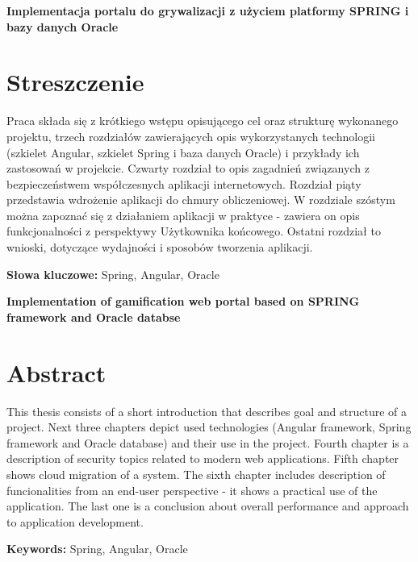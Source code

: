 \newpage
\begin{center}
\large \bf
Implementacja portalu do grywalizacji z użyciem platformy SPRING i bazy danych Oracle
\end{center}

\section*{Streszczenie}
Praca składa się z krótkiego wstępu opisującego cel oraz strukturę wykonanego projektu, trzech rozdziałów
zawierających opis wykorzystanych technologii (szkielet Angular, szkielet Spring i baza danych Oracle) i przykłady ich zastosowań w projekcie. Czwarty rozdział to opis zagadnień związanych z bezpieczeństwem współczesnych aplikacji internetowych. Rozdział piąty przedstawia wdrożenie aplikacji do chmury obliczeniowej. W rozdziale szóstym można zapoznać się z działaniem aplikacji w praktyce - zawiera on opis funkcjonalności z perspektywy Użytkownika końcowego. Ostatni rozdział to wnioski, dotyczące wydajności i sposobów tworzenia aplikacji.

\bigskip
{\noindent\bf Słowa kluczowe:} Spring, Angular, Oracle

\vskip 2cm


\begin{center}
\large \bf
Implementation of gamification web portal based on SPRING framework and Oracle databse
\end{center}

\section*{Abstract}
This thesis consists of a short introduction that describes goal and structure of a project. Next three chapters depict used technologies (Angular framework, Spring framework and Oracle database) and their use in the project. Fourth chapter is a description of security topics related to modern web applications. Fifth chapter shows cloud migration of a system. The sixth chapter includes description of funcionalities from an end-user perspective - it shows a practical use of the application. The last one is a conclusion about overall performance and approach to application development.

\bigskip
{\noindent\bf Keywords:} Spring, Angular, Oracle

\vfill